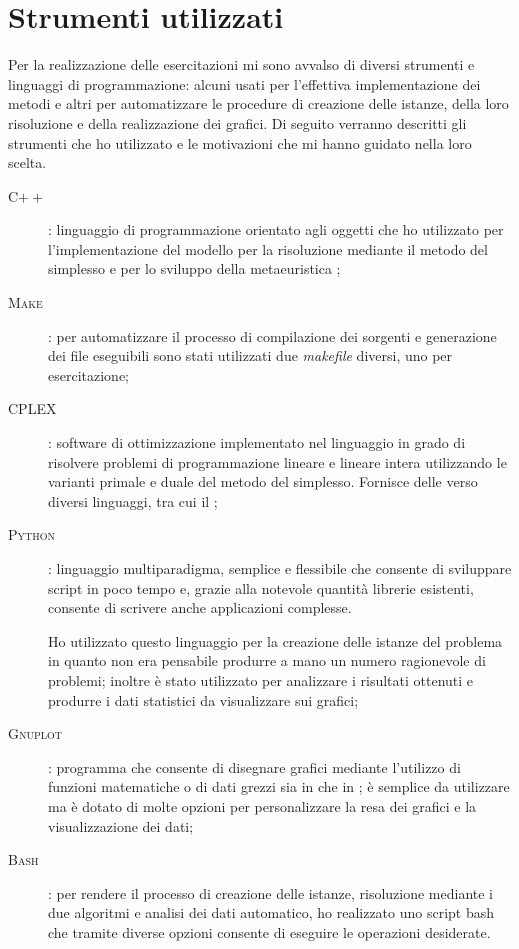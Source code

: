 \section{Strumenti utilizzati}
Per la realizzazione delle esercitazioni mi sono avvalso di diversi strumenti e linguaggi di programmazione: alcuni usati per l'effettiva implementazione dei metodi e altri per automatizzare le procedure di creazione delle istanze, della loro risoluzione e della realizzazione dei grafici.
Di seguito verranno descritti gli strumenti che ho utilizzato e le motivazioni che mi hanno guidato nella loro scelta.

\begin{description}
	\item[\textsc{C$++$}]: linguaggio di programmazione orientato agli oggetti che ho utilizzato per l'implementazione del modello per la risoluzione mediante il metodo del simplesso e per lo sviluppo della metaeuristica \tabu;
	\item[\textsc{Make}]: per automatizzare il processo di compilazione dei sorgenti e generazione dei file eseguibili sono stati utilizzati due \emph{makefile} diversi, uno per esercitazione;
	\item[\textsc{CPLEX}]: software di ottimizzazione implementato nel linguaggio  in grado di risolvere problemi di programmazione lineare e lineare intera utilizzando le varianti primale e duale del metodo del simplesso. Fornisce delle  verso diversi linguaggi, tra cui il ;
	\item[\textsc{Python}]: linguaggio multiparadigma, semplice e flessibile che consente di sviluppare script in poco tempo e, grazie alla notevole quantità librerie esistenti, consente di scrivere anche applicazioni complesse.
	
	Ho utilizzato questo linguaggio per la creazione delle istanze del problema in quanto non era pensabile produrre a mano un numero ragionevole di problemi; inoltre è stato utilizzato per analizzare i risultati ottenuti e produrre i dati statistici da visualizzare sui grafici;
	\item[\textsc{Gnuplot}]: programma che consente di disegnare grafici mediante l'utilizzo di funzioni matematiche o di dati grezzi sia in  che in ; è semplice da utilizzare ma è dotato di molte opzioni per personalizzare la resa dei grafici e la visualizzazione dei dati;
	\item[\textsc{Bash}]: per rendere il processo di creazione delle istanze, risoluzione mediante i due algoritmi e analisi dei dati automatico, ho realizzato uno script bash che tramite diverse opzioni consente di eseguire le operazioni desiderate.
\end{description}

